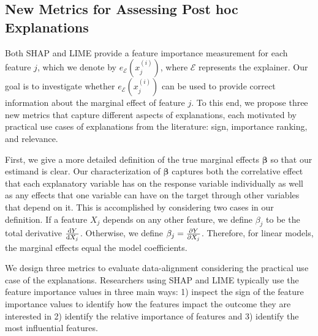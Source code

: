 \documentclass[mnsc,blindrev]{informs3}
\newcommand{\mE}{\mathcal{E}}
\begin{document}
\subsection{New Metrics for Assessing Post hoc Explanations}
   \label{sec:evaluating_faithfulness}
  Both SHAP and LIME provide a feature importance measurement for each feature $j$, which we denote by $e_\mE(x^{(i)}_j)$, where $\mE$ represents the explainer.
   Our goal is to investigate whether $e_\mE(x^{(i)}_j)$ can be used to provide correct information about the marginal effect of feature $j$. To this end, we propose three new metrics that capture different aspects of explanations, each motivated by practical use cases of explanations from the literature: sign, importance ranking, and relevance. 
     
     First, we give a more detailed definition of the true marginal effects $\boldsymbol{\beta}$ so that our estimand is clear. Our characterization of $\boldsymbol{\beta}$ captures both the correlative effect that each explanatory variable has on the response variable individually as well as any effects that one variable can have on the target through other variables that depend on it. This is accomplished by considering two cases in our definition. If a feature $X_j$ depends on any other feature, we define $\beta_j$ to be the total derivative $\dv{Y}{X_j}$. Otherwise, we define $\beta_j = \pdv{Y}{X_j}$. Therefore, for linear models, the marginal effects equal the model coefficients.



         
          We design three metrics to evaluate data-alignment  considering the practical use case of the explanations. Researchers using SHAP and LIME typically use the feature importance values in three main ways: 1) inspect the sign of the feature importance values to identify how the features impact the outcome they are interested in %
         2)  identify the relative importance of features %
         and 3) identify the most influential features. %
\end{document}
